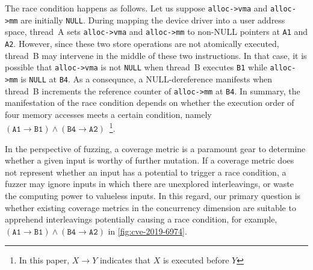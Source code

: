 The race condition happens as follows. Let us suppose
\texttt{alloc->vma} and \texttt{alloc->mm} are initially
\texttt{NULL}.
%
During mapping the device driver into a user address space, thread~A
sets \texttt{alloc->vma} and \texttt{alloc->mm} to non-NULL pointers
at \texttt{A1} and \texttt{A2}.
%
However, since these two store operations are not atomically executed,
thread~B may intervene in the middle of these two instructions.
%
In that case, it is possible that \texttt{alloc->vma} is not
\texttt{NULL} when thread~B executes \texttt{B1} while
\texttt{alloc->mm} is \texttt{NULL} at \texttt{B4}.
%
As a consequnce, a NULL-dereference manifests when thread~B increments
the reference counter of \texttt{alloc->mm} at \texttt{B4}.
%
In summary, the manifestation of the race condition depends on whether
the execution order of four memory accesses meets a certain condition,
namely
$(\texttt{A1} \rightarrow \texttt{B1}) \wedge (\texttt{B4} \rightarrow
\texttt{A2})$~\footnote{In this paper, $X \rightarrow Y$ indicates that $X$
  is executed before $Y$}.






%
In the perspective of fuzzing, a coverage metric is a paramount gear
to determine whether a given input is worthy of further mutation.
%
If a coverage metric does not represent whether an input has a
potential to trigger a race condition, a fuzzer may ignore inputs in
which there are unexplored interleavings, or waste the computing power
to valueless inputs.
%
In this regard, our primary question is whether existing coverage
metrics in the concurrency dimension are suitable to apprehend
interleavings potentially causing a race condition, for example,
$(\texttt{A1} \rightarrow \texttt{B1}) \wedge (\texttt{B4} \rightarrow
\texttt{A2})$ in \autoref{fig:cve-2019-6974}.



